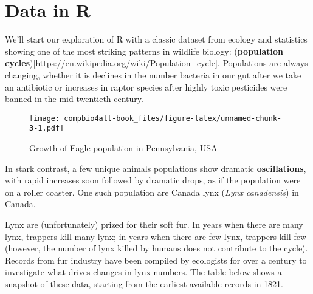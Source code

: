 \documentclass[
]{book}
\begin{document}
\hypertarget{data-in-r}{%
\section{Data in R}\label{data-in-r}}

We'll start our exploration of R with a classic dataset from ecology and statistics showing one of the most striking patterns in wildlife biology: (\textbf{population cycles}){[}\url{https://en.wikipedia.org/wiki/Population_cycle}{]}. Populations are always changing, whether it is declines in the number bacteria in our gut after we take an antibiotic or increases in
raptor species after highly toxic pesticides were banned in the mid-twentieth century.

\begin{figure}
\centering
\texttt{[image: compbio4all-book\_files/figure-latex/unnamed-chunk-3-1.pdf]}
\caption{\label{fig:unnamed-chunk-3}Growth of Eagle population in Pennsylvania, USA}
\end{figure}

In stark contrast, a few unique animals populations show dramatic \textbf{oscillations}, with rapid increases soon followed by dramatic drops, as if the population were on a roller coaster. One such population are Canada lynx (\emph{Lynx canadensis}) in Canada.

Lynx are (unfortunately) prized for their soft fur. In years when there are many lynx, trappers kill many lynx; in years when there are few lynx, trappers kill few (however, the number of lynx killed by humans does not contribute to the cycle). Records from fur industry have been compiled by ecologists for over a century to investigate what drives changes in lynx numbers. The table below shows a snapshot of these data, starting from the earliest available records in 1821.
\end{document}
